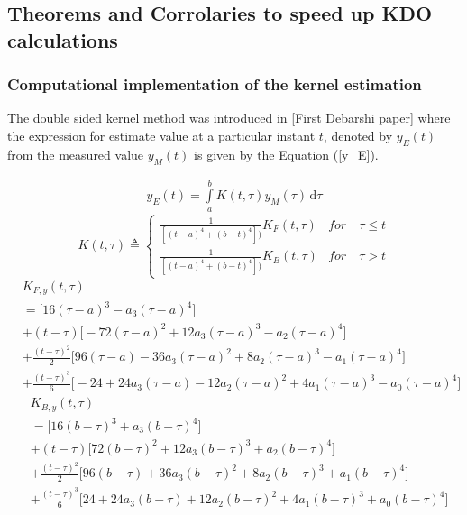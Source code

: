 \documentclass{article}
\begin{document}
\subsection{Theorems and Corrolaries  to speed up KDO calculations}
\subsubsection{Computational implementation of the kernel estimation}
The double sided kernel method was introduced in [First Debarshi paper] where the expression for estimate value at a particular instant $t$, denoted by $y_E(t)$ from the measured value $y_M(t)$ is given by the Equation (\ref{y_E}). 

\begin{equation}
\begin{split}
y_E(t) = \int\limits_{a}^{b}K(t,\tau) y_M(\tau)\, \mathrm{d}\tau
\end{split}
\label{y_E}
\end{equation}
\begin{equation}
K(t,\tau) \triangleq \left\{
\begin{array}{lr}
\frac{1}{[(t-a)^4+(b-t)^4])} K_{F}(t,\tau) & for \quad \tau \le t\\
\frac{1}{[(t-a)^4+(b-t)^4])} K_{B}(t,\tau) & for \quad \tau > t
\end{array}
\right.
\label{K}
\end{equation}
\begin{equation}\label{Kf}
\begin{split}
	& K_{F,y}(t,\tau)\\
	&=\bigg[16(\tau-a)^{3}-a_3(\tau-a)^{4}\bigg]\\
	&+(t-\tau)\bigg[-72(\tau-a)^2 + 12a_3(\tau-a)^3 - a_2(\tau-a)^4\bigg]\\
	&+\frac{(t-\tau)^2}{2}\bigg[96(\tau-a) - 36a_3(\tau-a)^2 + 8a_2(\tau-a)^3 -a_1(\tau-a)^4\bigg]\\
	&+\frac{(t-\tau)^3}{6}\bigg[-24 + 24a_3(\tau-a) - 12a_2(\tau-a)^2 + 4a_1(\tau-a)^3 - a_0(\tau-a)^4\bigg]	
\end{split}
\end{equation}
\begin{equation}\label{eqn.73}
\begin{split}
	&K_{B,y}(t,\tau)\\
	&=\bigg[16(b-\tau)^{3} + a_3(b-\tau)^{4}\bigg]\\
	&+(t-\tau)\bigg[72(b-\tau)^{2} + 12a_3(b-\tau)^{3} + a_2(b-\tau)^{4}\bigg]\\
	&+\frac{(t-\tau)^{2}}{2}\bigg[96(b-\tau)+36a_3(b-\tau)^{2} + 8a_2(b-\tau)^{3} + a_1(b-\tau)^{4}\bigg]\\
	&+\frac{(t-\tau)^{3}}{6}\bigg[24+24a_3(b-\tau)+12a_2(b-\tau)^{2}+4a_1(b-\tau)^{3}+a_0(b-\tau)^{4}\bigg]
\end{split}
\end{equation}
\end{document}
